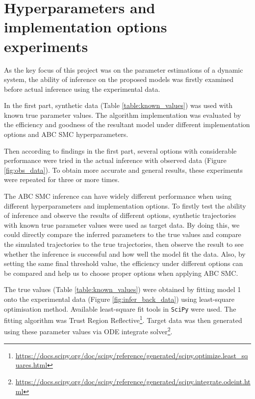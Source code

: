 




\section{Hyperparameters and implementation options experiments}

As the key focus of this project was on the parameter estimations of a dynamic system, the ability of inference on the proposed models was firstly examined before actual inference using the experimental data.

In the first part, synthetic data (Table \ref{table:known_values}) was used with known true parameter values. The algorithm implementation was evaluated by the efficiency and goodness of the resultant model under different implementation options and ABC SMC hyperparameters.

Then according to findings in the first part, several options with considerable performance were tried in the actual inference with observed data (Figure \ref{fig:obs_data}). To obtain more accurate and general results, these experiments were repeated for three or more times.





    The ABC SMC inference can have widely different performance when using different hyperparameters and implementation options. To firstly test the ability of inference and observe the results of different options, synthetic trajectories with known true parameter values were used as target data. By doing this, we could directly compare the inferred parameters to the true values and compare the simulated trajectories to the true trajectories, then observe the result to see whether the inference is successful and how well the model fit the data. Also, by setting the same final threshold value, the efficiency under different options can be compared and help us to choose proper options when applying ABC SMC. 

    The true values (Table \ref{table:known_values}) were obtained by fitting model 1 onto the experimental data (Figure \ref{fig:infer_back_data}) using least-square optimisation method. Available least-square fit tools in \verb|SciPy| were used. The fitting algorithm was Trust Region Reflective\footnote{\url{https://docs.scipy.org/doc/scipy/reference/generated/scipy.optimize.least_squares.html}}. Target data was then generated using these parameter values via ODE integrate solver\footnote{\url{https://docs.scipy.org/doc/scipy/reference/generated/scipy.integrate.odeint.html}}.


